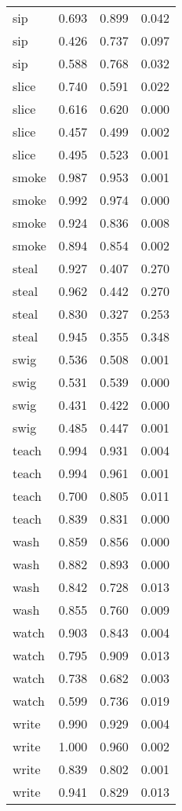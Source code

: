 \begin{longtable}{l|rrr}
sip       & 0.693  & 0.899     & 0.042         \\
sip       & 0.426  & 0.737     & 0.097         \\
sip       & 0.588  & 0.768     & 0.032         \\
slice     & 0.740   & 0.591     & 0.022         \\
slice     & 0.616  & 0.620      & 0.000             \\
slice     & 0.457  & 0.499     & 0.002         \\
slice     & 0.495  & 0.523     & 0.001         \\
smoke     & 0.987  & 0.953     & 0.001         \\
smoke     & 0.992  & 0.974     & 0.000             \\
smoke     & 0.924  & 0.836     & 0.008         \\
smoke     & 0.894  & 0.854     & 0.002         \\
steal     & 0.927  & 0.407     & 0.270          \\
steal     & 0.962  & 0.442     & 0.270          \\
steal     & 0.830   & 0.327     & 0.253         \\
steal     & 0.945  & 0.355     & 0.348         \\
swig      & 0.536  & 0.508     & 0.001         \\
swig      & 0.531  & 0.539     & 0.000             \\
swig      & 0.431  & 0.422     & 0.000             \\
swig      & 0.485  & 0.447     & 0.001         \\
teach     & 0.994  & 0.931     & 0.004         \\
teach     & 0.994  & 0.961     & 0.001         \\
teach     & 0.700    & 0.805     & 0.011         \\
teach     & 0.839  & 0.831     & 0.000             \\
wash      & 0.859  & 0.856     & 0.000             \\
wash      & 0.882  & 0.893     & 0.000             \\
wash      & 0.842  & 0.728     & 0.013         \\
wash      & 0.855  & 0.760      & 0.009         \\
watch     & 0.903  & 0.843     & 0.004         \\
watch     & 0.795  & 0.909     & 0.013         \\
watch     & 0.738  & 0.682     & 0.003         \\
watch     & 0.599  & 0.736     & 0.019         \\
write     & 0.990   & 0.929     & 0.004         \\
write     & 1.000      & 0.960      & 0.002         \\
write     & 0.839  & 0.802     & 0.001         \\
write     & 0.941  & 0.829     & 0.013        
\end{longtable}

